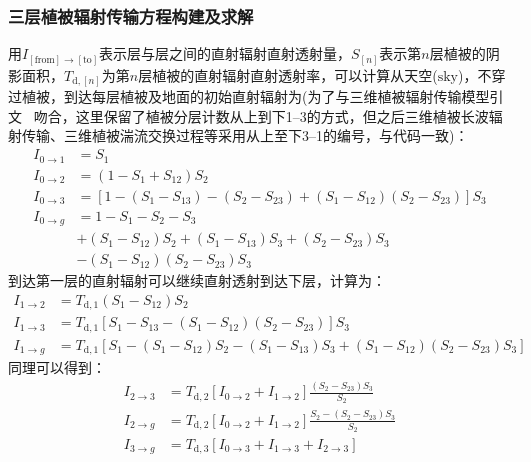 \subsubsection{三层植被辐射传输方程构建及求解}

用$I_{\mathrm{\left[from\right]\rightarrow\left[to\right]}}$表示层与层之间的直射辐射直射透射量，$S_{[n]}$表示第$n$层植被的阴影面积，$T_{\mathrm{d},[n]}$为第$n$层植被的直射辐射直射透射率，可以计算从天空(${\mathrm {sky}}$)，不穿过植被，到达每层植被及地面的初始直射辐射为(为了与三维植被辐射传输模型引文~\citep{yuan20143d} 吻合，这里保留了植被分层计数从上到下1--3的方式，但之后三维植被长波辐射传输、三维植被湍流交换过程等采用从上至下3--1的编号，与代码一致)：
\begin{equation}
  \begin{aligned} I_{0 \rightarrow 1} &=S_{1} \\ I_{0 \rightarrow 2} &=\left(1-S_{1}+S_{12}\right) S_{2} \\
    I_{0 \rightarrow 3} &=\left[1-\left(S_{1}-S_{13}\right)-\left(S_{2}-S_{23}\right)+\left(S_{1}-S_{12}\right)\left(S_{2}-S_{23}\right)\right] S_{3} \\
    I_{0 \rightarrow g} &=1-S_{1}-S_{2}-S_{3} \\ &+\left(S_{1}-S_{12}\right) S_{2}+\left(S_{1}-S_{13}\right) S_{3}+\left(S_{2}-S_{23}\right) S_{3} \\
  &-\left(S_{1}-S_{12}\right)\left(S_{2}-S_{23}\right) S_{3} \end{aligned}
\end{equation}
到达第一层的直射辐射可以继续直射透射到达下层，计算为：
\begin{equation}
  \begin{aligned}
    I_{1 \rightarrow 2} &=T_{\mathrm{d, 1}}\left(S_{1}-S_{12}\right) S_{2} \\[1ex]
    I_{1 \rightarrow 3}&=T_{\mathrm{d, 1}}\left[S_{1}-S_{13}-\left(S_{1}-S_{12}\right)\left(S_{2}-S_{23}\right)\right] S_{3} \\[1ex]
    I_{1 \rightarrow g} &=T_{\mathrm{d, 1}}\left[S_{1}-\left(S_{1}-S_{12}\right) S_{2}-\left(S_{1}-S_{13}\right) S_{3}+\left(S_{1}-S_{12}\right)\left(S_{2}-S_{23}\right) S_{3}\right]
  \end{aligned}
\end{equation}
同理可以得到：
\begin{equation}
  \begin{aligned}
    I_{2 \rightarrow 3} & =T_{\mathrm{d, 2}}\left[I_{0 \rightarrow 2}+I_{1 \rightarrow 2}\right] \frac{\left(S_{2}-S_{23}\right) S_{3}}{S_{2}} \\[1ex]
    I_{2 \rightarrow g} & =T_{\mathrm{d, 2}}\left[I_{0 \rightarrow 2}+I_{1 \rightarrow 2}\right] \frac{S_{2}-\left(S_{2}-S_{23}\right) S_{3}}{S_{2}} \\[1ex]
    I_{3 \rightarrow g} &=T_{\mathrm{d, 3}}\left[I_{0 \rightarrow 3}+I_{1 \rightarrow 3}+I_{2 \rightarrow 3}\right]
  \end{aligned}
\end{equation}


